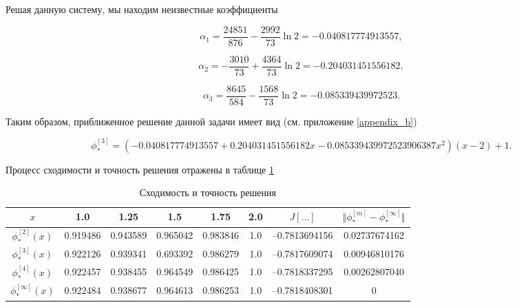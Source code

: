\documentclass{article}
\begin{document}
\noindent Решая данную систему, мы находим неизвестные коэффициенты

\begin{displaymath}
	\alpha_{1} = \frac{24851}{876} - \frac{2992}{73} \ln{2} = -0.040817774913557,
\end{displaymath}

\begin{equation}	
	\alpha_{2} = -\frac{3010}{73} + \frac{4364}{73} \ln{2} = -0.204031451556182, 
\end{equation}

\begin{displaymath}
	\alpha_{3} = \frac{8645}{584} - \frac{1568}{73} \ln{2} = -0.085339439972523.
\end{displaymath}

Таким образом, приближенное решение данной задачи имеет вид (см. приложение \ref{appendix_b})

\begin{equation}	
	\phi_{\ast}^{[3]} = (-0.040817774913557+0.204031451556182x -0.085339439972523906387x^2)(x-2) + 1.
\end{equation}

\noindent Процесс сходимости и точность решения отражены в таблице \ref{table_process_of_convergence_rank_2}

\begin{table}[!h]
\centering
\begin{tabular}{|c|c|c|c|c|c|c|c|}
	\hline
	$x$ & 1.0 & 1.25 & 1.5 & 1.75 & 2.0 & $J[\ldots]$ & $\Vert \phi_{\ast}^{[m]} - \phi_{\ast}^{[\infty]} \Vert$ \\
	\hline \hline

	$\phi_{\ast}^{[2]}(x)$ & 0.919486 & 0.943589 & 0.965042 & 0.983846 & 1.0 & –0.7813694156 & 0.02737674162 \\	\hline
	$\phi_{\ast}^{[3]}(x)$ & 0.922126 & 0.939341 & 0.693392 & 0.986279 & 1.0 & –0.7817609074 & 0.00946810176 \\	\hline
	$\phi_{\ast}^{[4]}(x)$ & 
0.922457 & 0.938455 & 0.964549 & 0.986425 & 1.0 & –0.7818337295 & 0.00262807040 \\	\hline
	$\phi_{\ast}^{[\infty]}(x)$ & 0.922484 & 0.938677 & 0.964613 & 0.986253 & 1.0 & –0.7818408301 & 0 \\	\hline

\end{tabular}
\caption{Сходимость и точность решения}
\label{table_process_of_convergence_rank_2}
\end{table}
\end{document}
